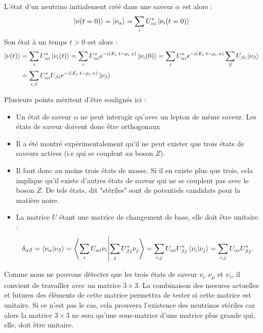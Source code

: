             L'état d'un neutrino initialement créé dans une saveur $\alpha$ est alors :
            \begin{equation}
            	\ket{\nu(t=0)} = \ket{\nu_{\alpha}} = \sum_i U_{\alpha i}^*\ket{\nu_i(t=0)}
            \end{equation}
            Son état à un temps $t > 0$ est alors :
            \begin{equation}
	            \begin{split}
	            	\ket{\nu(t)} &=\sum_{i} U_{\alpha i}^*\ket{\nu_i(t)} = \sum_{i} U_{\alpha i}^* e^{-i(E_i\cdot t - p_i\cdot x)}\ket{\nu_i(0)} = \sum_{i} U_{\alpha i}^* e^{-i(E_i\cdot t - p_i\cdot x)}\sum_{\beta}U_{\beta i}\ket{\nu_{\beta}}\\ & = \sum_{i,\beta} U_{\alpha i}^*U_{\beta i} e^{-i(E_i\cdot t - p_i\cdot x)}\ket{\nu_{\beta}}
            	\end{split}
            \end{equation}
            
            Plusieurs points méritent d'être soulignés ici :
            \begin{itemize}
                \item Un état de saveur $\alpha$ ne peut interagir qu'avec un lepton de même saveur. Les états de saveur doivent donc être orthogonaux
                \item Il a été montré expérimentalement qu'il ne peut exister que trois états de saveurs actives (i.e qui se couplent au boson $Z$)\cite{pdg2018}.
                \item Il faut donc au moins trois états de masse. Si il en existe plus que trois, cela implique qu'il existe d'autres états de saveur qui ne se couplent pas avec le boson $Z$. De tels états, dit "stériles" sont de potentiels candidats pour la matière noire.
                \item La matrice $U$ étant une matrice de changement de base, elle doit être unitaire :
                \begin{equation*}
                    \delta_{\alpha\beta} = \braket{\nu_{\alpha}}{\nu_{\beta}} = \braket{\sum_i U_{\alpha i}\nu_i}{\sum_j U_{\beta j}^*\nu_j} = \sum_{i,j} U_{\alpha i}U_{\beta j}^* \braket{\nu_i}{\nu_j} = \sum_{i,j} U_{\alpha i}U_{\beta j}^*.
                \end{equation*}
            \end{itemize}
            Comme nous ne pouvons détecter que les trois états de saveur $\nu_e$ $\nu_{\mu}$ et $\nu_{\tau}$, il convient de travailler avec un matrice $3\times3$. La combinaison des mesures actuelles et futures des éléments de cette matrice\cite{Qian2013} permettra de tester si cette matrice est unitaire. Si ce n'est pas le cas, cela prouvera l'existence des neutrinos stériles car alors la matrice $3\times3$ ne sera qu'une sous-matrice d'une matrice plus grande qui, elle, doit être unitaire.
            
